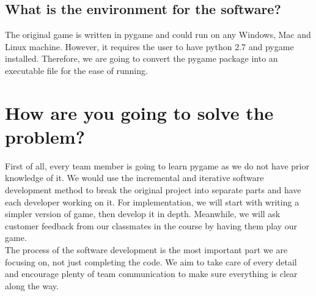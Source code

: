 \documentclass[12pt]{article}
\begin{document}
    \subsection {What is the environment for the software?}
    The original game is written in pygame and could run on any Windows, Mac and Linux machine. However, it requires the user to have python 2.7 and pygame installed. Therefore, we are going to convert the pygame package into an executable file for the ease of running.

\section{How are you going to solve the problem?}
First of all, every team member is going to learn pygame as we do not have prior knowledge of it. We would use the incremental and iterative software development method to break the original project into separate parts and have each developer working on it. For implementation, we will start with writing a simpler version of game, then develop it in depth. Meanwhile, we will ask customer feedback from our classmates in the course by having them play our game.\\The process of the software development is the most important part we are focusing on, not just completing the code. We aim to take care of every detail and encourage plenty of team communication to make sure everything is clear along the way.
\end{document}
